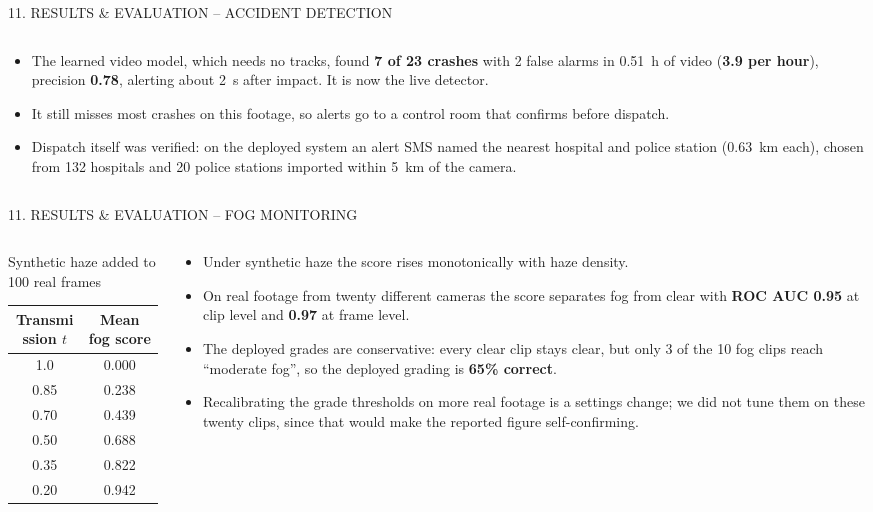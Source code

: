 \documentclass[aspectratio=169,10pt,t]{beamer}
\begin{document}
\begin{frame}{11. RESULTS \& EVALUATION -- ACCIDENT DETECTION}
\begin{columns}[T,onlytextwidth]
\begin{column}{0.5\textwidth}
\begin{itemize}
  \item The learned video model, which needs no tracks, found \textbf{7 of 23 crashes} with 2 false alarms in
        0.51~h of video (\textbf{3.9 per hour}), precision \textbf{0.78}, alerting about 2~s after impact. It is now
        the live detector.
  \item It still misses most crashes on this footage, so alerts go to a control room that confirms before dispatch.
  \item Dispatch itself was verified: on the deployed system an alert SMS named the nearest hospital and police
        station (0.63~km each), chosen from 132 hospitals and 20 police stations imported within 5~km of the camera.
\end{itemize}
\end{column}
\end{columns}
\end{frame}

\begin{frame}{11. RESULTS \& EVALUATION -- FOG MONITORING}
\begin{columns}[T,onlytextwidth]
\begin{column}{0.45\textwidth}
\centering
{\tiny Synthetic haze added to 100 real frames}\\[0.2em]
\scriptsize
\begin{tabular}{@{}cc@{}}
\toprule
\textbf{Transmission $t$} & \textbf{Mean fog score}\\
\midrule
1.0  & 0.000\\
0.85 & 0.238\\
0.70 & 0.439\\
0.50 & 0.688\\
0.35 & 0.822\\
0.20 & 0.942\\
\bottomrule
\end{tabular}
\end{column}
\begin{column}{0.52\textwidth}
\scriptsize
\begin{itemize}\setlength{\itemsep}{0.3em}
  \item Under synthetic haze the score rises monotonically with haze density.
  \item On real footage from twenty different cameras the score separates fog from clear with \textbf{ROC AUC 0.95}
        at clip level and \textbf{0.97} at frame level.
  \item The deployed grades are conservative: every clear clip stays clear, but only 3 of the 10 fog clips reach
        ``moderate fog'', so the deployed grading is \textbf{65\% correct}.
  \item Recalibrating the grade thresholds on more real footage is a settings change; we did not tune them on these
        twenty clips, since that would make the reported figure self-confirming.
\end{itemize}
\end{column}
\end{columns}
\end{frame}
\end{document}
